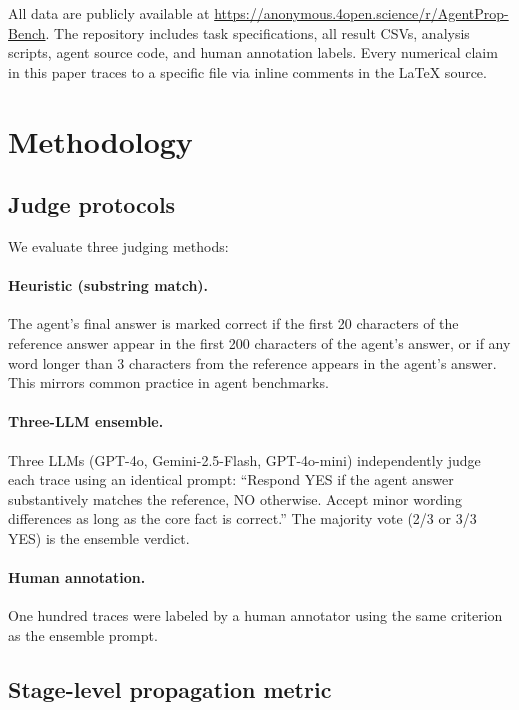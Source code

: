 \documentclass{article}
\begin{document}
All data are publicly available at
\url{https://anonymous.4open.science/r/AgentProp-Bench}.
The repository includes task specifications, all result CSVs, analysis
scripts, agent source code, and human annotation labels.
Every numerical claim in this paper traces to a specific file via
inline comments in the \LaTeX{} source.


\section{Methodology}
\label{sec:method}

\subsection{Judge protocols}

We evaluate three judging methods:

\paragraph{Heuristic (substring match).}
The agent's final answer is marked correct if the first 20 characters
of the reference answer appear in the first 200 characters of the
agent's answer, or if any word longer than 3 characters from the
reference appears in the agent's answer.
This mirrors common practice in agent benchmarks.

\paragraph{Three-LLM ensemble.}
Three LLMs (GPT-4o, Gemini-2.5-Flash, GPT-4o-mini) independently
judge each trace using an identical prompt: ``Respond YES if the agent
answer substantively matches the reference, NO otherwise.
Accept minor wording differences as long as the core fact is correct.''
The majority vote (2/3 or 3/3 YES) is the ensemble verdict.

\paragraph{Human annotation.}
One hundred traces were labeled by a human annotator using the same
criterion as the ensemble prompt.

\subsection{Stage-level propagation metric}
\label{sec:stagedef}
\end{document}
